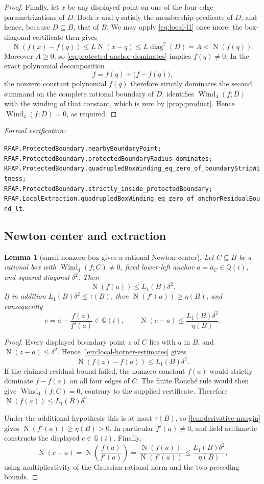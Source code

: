\documentclass[11pt]{article}
\newtheorem{lemma}[theorem]{Lemma}
\newcommand{\Qi}{\mathbb{Q}(i)}
\newcommand{\Norm}[1]{\operatorname{N}\!\left(#1\right)}
\newcommand{\Wind}{\operatorname{Wind}}
\newcommand{\diamq}{\operatorname{diag}^{2}}
\newcommand{\leanref}[1]{\par\smallskip\noindent
  \emph{Formal verification:}\par\nobreak
  {\raggedright\nolinkurl{#1}.\par}}
\begin{document}
\begin{proof}
Finally, let $x$ be any displayed point on one of the four edge
parametrizations of $D$.  Both $x$ and $q$ satisfy the membership predicate
of $D$, and hence, because $D\subseteq B$, that of $B$.  We may apply
\eqref{eq:local-l1} once more; the box-diagonal certificate then gives
\[
 \Norm{f(x)-f(q)}\le L\Norm{x-q}\le L\diamq(D)=A<\Norm{f(q)}.
\]
Moreover $A\ge0$, so \eqref{eq:protected-anchor-dominates} implies
$f(q)\ne0$.  In the exact polynomial decomposition
\[
                    f=f(q)+\bigl(f-f(q)\bigr),
\]
the nonzero constant polynomial $f(q)$ therefore strictly dominates the
second summand on the complete rational boundary of $D$.
 identifies $\Wind_4(f;D)$ with the winding of
that constant, which is zero by \cref{prop:product}.  Hence
$\Wind_4(f;D)=0$, as required.
\end{proof}

\leanref{RFAP.ProtectedBoundary.nearbyBoundaryPoint;
RFAP.ProtectedBoundary.protectedBoundaryRadius_dominates;
RFAP.ProtectedBoundary.quadrupledBoxWinding_eq_zero_of_boundaryStripWitness;
RFAP.ProtectedBoundary.strictly_inside_protectedBoundary;
RFAP.LocalExtraction.quadrupledBoxWinding_eq_zero_of_anchorResidualBound_lt}

\subsection{Newton center and extraction}

\begin{lemma}[small nonzero box gives a rational Newton center]
\label{lem:newton-center}
Let $C\subseteq B$ be a rational box with $\Wind_4(f;C)\ne0$, fixed lower-left
anchor $a=a_C\in\Qi$, and squared diagonal $\delta^2$.  Then
\[
     \Norm{f(a)}\le L_1(B)\delta^2.
\]
If in addition $L_1(B)\delta^2\le\tau(B)$, then
$\Norm{f'(a)}\ge\eta(B)$, and consequently
\[
       c=a-\frac{f(a)}{f'(a)}\in\Qi,
       \qquad
       \Norm{c-a}\le\frac{L_1(B)\delta^2}{\eta(B)}.
\]
\end{lemma}

\begin{proof}
Every displayed boundary point $z$ of $C$ lies with $a$ in $B$, and
$\Norm{z-a}\le\delta^2$.  Hence \cref{lem:local-horner-estimates} gives
\[
       \Norm{f(z)-f(a)}\le L_1(B)\delta^2.
\]
If the claimed residual bound failed, the nonzero constant $f(a)$ would
strictly dominate $f-f(a)$ on all four edges of $C$.  The finite Rouch\'e rule
would then give $\Wind_4(f;C)=0$, contrary to the supplied certificate.
Therefore $\Norm{f(a)}\le L_1(B)\delta^2$.

Under the additional hypothesis this is at most $\tau(B)$, so
\cref{lem:derivative-margin} gives
$\Norm{f'(a)}\ge\eta(B)>0$.  In particular $f'(a)\ne0$, and field arithmetic
constructs the displayed $c\in\Qi$.  Finally,
\[
 \Norm{c-a}
 =\Norm{\frac{f(a)}{f'(a)}}
 =\frac{\Norm{f(a)}}{\Norm{f'(a)}}
 \le\frac{L_1(B)\delta^2}{\eta(B)},
\]
using multiplicativity of the Gaussian-rational norm and the two preceding
bounds.
\end{proof}
\end{document}
